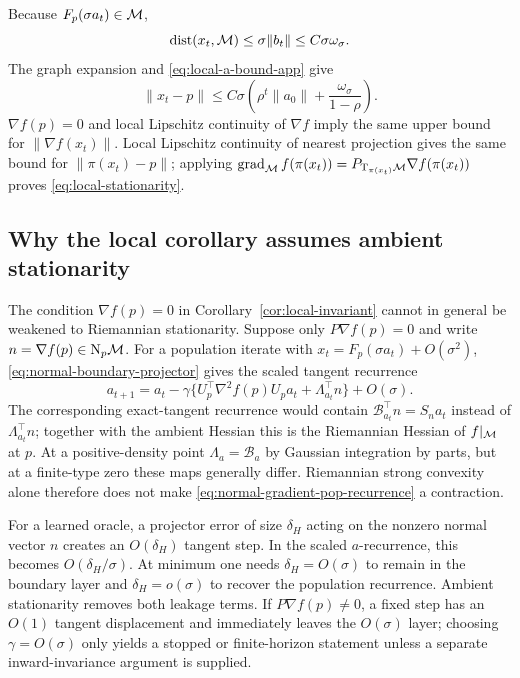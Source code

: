Because $F_p(\sigma a_t)\in\mathcal{M}$,
\begin{equation}
  \operatorname{dist}(x_t,\mathcal{M})\le\sigma\|b_t\|
  \le C\sigma\omega_\sigma.
\end{equation}
The graph expansion and \eqref{eq:local-a-bound-app} give
\begin{equation}
  \|x_t-p\|
  \le
  C\sigma\left(
    \rho^t\|a_0\|+\frac{\omega_\sigma}{1-\rho}
  \right).
  \label{eq:local-distance-app}
\end{equation}
$\nabla f(p)=0$ and local Lipschitz continuity of $\nabla f$
imply the same upper bound for $\|\nabla f(x_t)\|$.
Local Lipschitz continuity of nearest projection gives the same bound for
$\|\pi(x_t)-p\|$; applying
$\operatorname{grad}_{\mathcal{M}} f(\pi(x_t))
=P_{\mathrm{T}_{\pi(x_t)}\mathcal{M}}\nabla f(\pi(x_t))$
proves \eqref{eq:local-stationarity}.

\subsection{Why the local corollary assumes ambient stationarity}
\label{app:normal-gradient-caveat}

The condition $\nabla f(p)=0$ in
Corollary~\ref{cor:local-invariant} cannot in general be weakened to
Riemannian stationarity.  Suppose only
$P\nabla f(p)=0$ and write $n=\nabla f(p)\in\mathrm{N}_p\mathcal{M}$.  For a population
iterate with $x_t=F_p(\sigma a_t)+O(\sigma^2)$,
\eqref{eq:normal-boundary-projector} gives the scaled tangent recurrence
\begin{equation}
  a_{t+1}
  =
  a_t-\gamma\{
    U_p^\top\nabla^2f(p)U_pa_t+\Lambda_{a_t}^\top n
  \}+O(\sigma).
  \label{eq:normal-gradient-pop-recurrence}
\end{equation}
The corresponding exact-tangent recurrence would contain
$\mathcal B_{a_t}^\top n=S_na_t$ instead of
$\Lambda_{a_t}^\top n$; together with the ambient Hessian this is the
Riemannian Hessian of $f|_{\mathcal{M}}$ at $p$.  At a positive-density point
$\Lambda_a=\mathcal B_a$ by Gaussian integration by parts, but at a
finite-type zero these maps generally differ.  Riemannian strong
convexity alone therefore does not make
\eqref{eq:normal-gradient-pop-recurrence} a contraction.

For a learned oracle, a projector error of size $\delta_H$ acting on the nonzero normal vector $n$ creates an $O(\delta_H)$ tangent step.  In the scaled $a$-recurrence, this becomes $O(\delta_H/\sigma)$.  At minimum one needs
$\delta_H=O(\sigma)$ to remain in the boundary layer and
$\delta_H=o(\sigma)$ to recover the population recurrence.  Ambient
stationarity removes both leakage terms.  If
$P\nabla f(p)\ne0$, a fixed step has an $O(1)$ tangent displacement and
immediately leaves the $O(\sigma)$ layer; choosing $\gamma=O(\sigma)$
only yields a stopped or finite-horizon statement unless a separate
inward-invariance argument is supplied.

